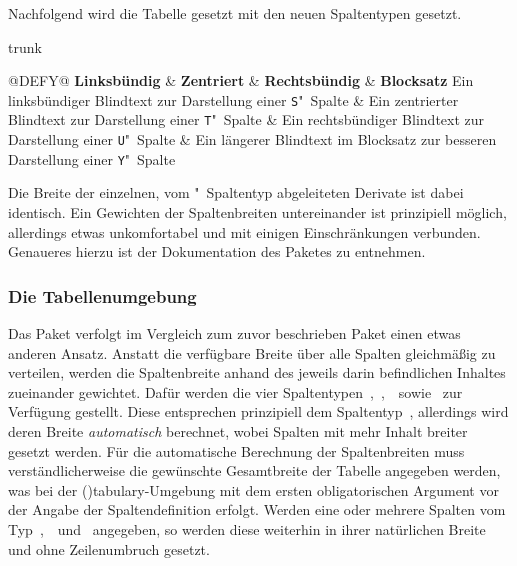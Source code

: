 \documentclass[%
  english,ngerman,%
  cdgeometry=no,DIV=12,%
  cd=false,cdfont=false,cdtitle=true,%
  headings=normal,%
  automark,%
  listof=toc,%
]{tudscrartcl}
\begin{document}
Nachfolgend wird die Tabelle gesetzt mit den neuen Spaltentypen gesetzt.
%
\begin{Code}[input]{trunk}
\begin{table}
\begin{tabularx}{\textwidth}{@{}DEFY@{}}
\toprule
\textbf{Linksbündig} & \textbf{Zentriert} & 
\textbf{Rechtsbündig} & \textbf{Blocksatz} \tabularnewline
\midrule
Ein linksbündiger Blindtext 
  zur Darstellung einer \texttt{S}"~Spalte &
Ein zentrierter Blindtext 
  zur Darstellung einer \texttt{T}"~Spalte &
Ein rechtsbündiger Blindtext 
  zur Darstellung einer \texttt{U}"~Spalte &
Ein längerer Blindtext im Blocksatz 
  zur besseren Darstellung einer \texttt{Y}"~Spalte
\tabularnewline\bottomrule
\end{tabularx}
\caption{Eine \texttt{tabularx}-Tabelle\label{tab:tabularx}}
\end{table}

\end{Code}

Die Breite der einzelnen, vom "~Spaltentyp abgeleiteten Derivate ist 
dabei identisch. Ein Gewichten der Spaltenbreiten untereinander ist prinzipiell 
möglich, allerdings etwas unkomfortabel und mit einigen Einschränkungen 
verbunden. Genaueres hierzu ist der Dokumentation des Paketes 
 zu entnehmen.



\subsubsection{%
  Die Tabellenumgebung %
  \label{sec:tabulary}%
}

Das Paket  verfolgt im Vergleich zum zuvor beschrieben Paket 
 einen etwas anderen Ansatz. Anstatt die verfügbare Breite 
über alle Spalten gleichmäßig zu verteilen, werden die Spaltenbreite anhand des 
jeweils darin befindlichen Inhaltes zueinander gewichtet. Dafür werden die vier 
Spaltentypen~,~,~~sowie~ zur Verfügung 
gestellt. Diese entsprechen prinzipiell dem Spaltentyp~, allerdings 
wird deren Breite \emph{automatisch} berechnet, wobei Spalten mit mehr Inhalt 
breiter gesetzt werden. Für die automatische Berechnung der Spaltenbreiten muss 
verständlicherweise die gewünschte Gesamtbreite der Tabelle angegeben werden, 
was bei der \Environment(){tabulary}-Umgebung mit dem ersten 
obligatorischen Argument vor der Angabe der Spaltendefinition erfolgt. Werden 
eine oder mehrere Spalten vom Typ~,~~und~ 
angegeben, so werden diese weiterhin in ihrer natürlichen Breite und ohne 
Zeilenumbruch gesetzt. 
\end{document}
